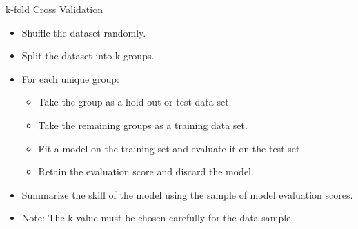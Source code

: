 \documentclass[aspectratio=1610, t]{beamer}\usepackage[]{graphicx}\usepackage[]{color}
\begin{document}
\begin{frame}[t]{k-fold Cross Validation}

\begin{itemize}
  \item Shuffle the dataset randomly.
  \item Split the dataset into k groups.
  \item For each unique group:
  \begin{itemize}
    \item Take the group as a hold out or test data set.
    \item Take the remaining groups as a training data set.
    \item Fit a model on the training set and evaluate it on the test set.
    \item Retain the evaluation score and discard the model.
  \end{itemize}
  \item Summarize the skill of the model using the sample of model evaluation scores.
  \item Note: The k value must be chosen carefully for the data sample.
\end{itemize}
        
\end{frame}
\end{document}
